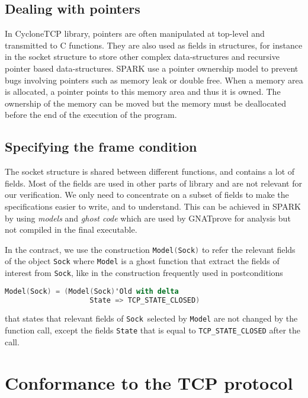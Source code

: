 \documentclass[conference]{IEEEtran}
\def\spark#1{\lstinline[language=Ada]{#1}}
\begin{document}
\subsection{Dealing with pointers}
\label{sec:pointers}

In CycloneTCP library, pointers are often manipulated at top-level and transmitted
to C functions. They are also used as fields in structures, for instance in
the socket structure to store other complex data-structures and recursive pointer
based data-structures. SPARK use a pointer ownership model to prevent bugs
involving pointers such as memory leak or double free. When a memory area is
allocated, a pointer points to this memory area and thus it is owned.
The ownership of the memory can be moved but the memory must be deallocated
before the end of the execution of the program.

\subsection{Specifying the frame condition}

The socket structure is shared between different functions, and contains a lot
of fields. Most of the fields are used in other parts of library and are not
relevant for our verification. We only need to concentrate on a subset of fields
to make the specifications easier to write, and to understand.
This can be achieved in SPARK by using \emph{models} and \emph{ghost code}
which are used by GNATprove for analysis but not compiled in the final executable.

In the contract, we use the construction \spark{Model(Sock)} to refer the
relevant fields of the object \spark{Sock} where
\spark{Model} is a ghost function that extract the fields of interest from
\spark{Sock}, like in the construction frequently used in postconditions
\begin{lstlisting}[language=Ada, basicstyle=\small\ttfamily]
Model(Sock) = (Model(Sock)'Old with delta
                    State => TCP_STATE_CLOSED)
\end{lstlisting}
that states that relevant fields of \spark{Sock} selected by \spark{Model} are
not changed by the function call, except the fields \spark{State} that is equal
to \spark{TCP_STATE_CLOSED} after the call.

\section{Conformance to the TCP protocol}
\label{sec:verif}
\end{document}

